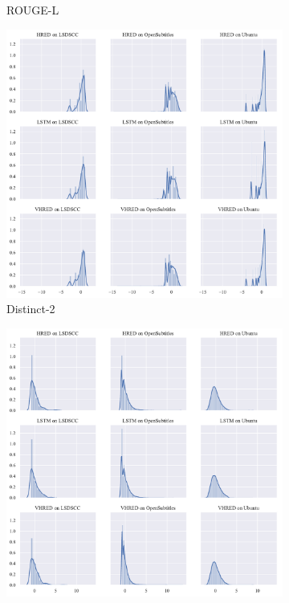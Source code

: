 \begin{figure}[H]
\begin{subfigure}{0.33\linewidth}
        \caption{ROUGE-L}
    \end{subfigure}
    \begin{subfigure}{0.33\linewidth}
        \centering
        \includegraphics[width=\linewidth]{figure/distplot_grid/distinct_2/plot.pdf}
        \caption{Distinct-2}
    \end{subfigure}%
    \begin{subfigure}{0.33\linewidth}
        \centering
        \includegraphics[width=\linewidth]{figure/distplot_grid/meteor/plot.pdf}

\end{subfigure}
\end{figure}
